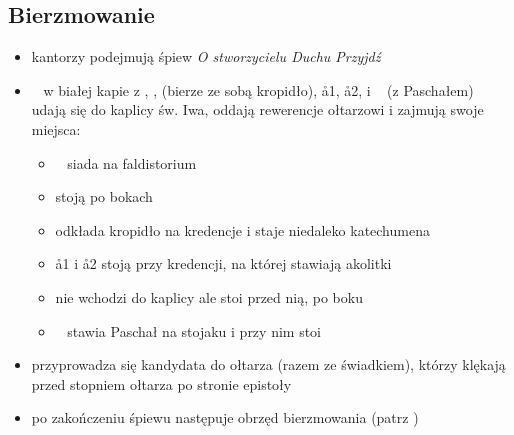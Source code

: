 \subsection{Bierzmowanie}
\begin{itemize}
	\item kantorzy podejmują śpiew \textit{O stworzycielu Duchu Przyjdź}
	\item \ii~ w \textcolor{black!50}{białej kapie} z , ,  (bierze ze sobą kropidło),
	      \aa1, \aa2,  i \paschal~ (z Paschałem) udają się do kaplicy
	      św. Iwa, oddają rewerencje ołtarzowi i zajmują swoje miejsca:
	      \begin{itemize}
		      \item \ii~ siada na faldistorium
		      \item {} stoją po bokach \ii~
		      \item {} odkłada kropidło na kredencje i staje niedaleko
		            katechumena
		      \item \aa1 i \aa2 stoją przy kredencji, na której stawiają
		            akolitki
		      \item {} nie wchodzi do kaplicy ale stoi przed nią, po boku
		      \item \paschal~ stawia Paschał na stojaku i przy nim stoi
	      \end{itemize}
	\item przyprowadza się kandydata do ołtarza (razem ze świadkiem), którzy
	      klękają przed stopniem ołtarza po stronie epistoły
	\item po zakończeniu śpiewu następuje obrzęd bierzmowania (patrz
	      \textit{})
\end{itemize}
